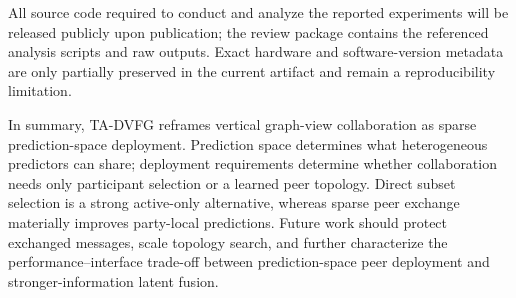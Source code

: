 \documentclass[letterpaper]{article} %
\newcommand{\method}{\textsc{TA-DVFG}}
\begin{document}
All source code required to conduct and analyze the reported experiments will be
released publicly upon publication; the review package contains the referenced
analysis scripts and raw outputs. Exact hardware and software-version metadata
are only partially preserved in the current artifact and remain a
reproducibility limitation.

In summary, \method{} reframes vertical graph-view collaboration as sparse
prediction-space deployment. Prediction space determines what heterogeneous
predictors can share; deployment requirements determine whether collaboration
needs only participant selection or a learned peer topology. Direct subset
selection is a strong active-only alternative, whereas sparse peer exchange
materially improves party-local predictions. Future work should protect
exchanged messages, scale topology search, and further characterize the
performance--interface trade-off between prediction-space peer deployment and
stronger-information latent fusion.


\end{document}
